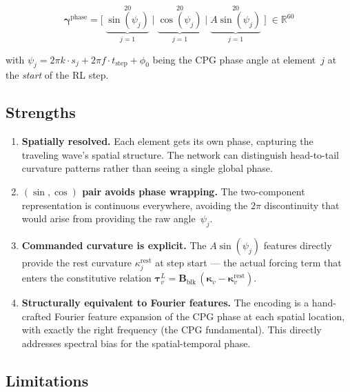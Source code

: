 \documentclass[11pt]{article}
\newcommand{\vect}[1]{\mathbf{#1}}
\newcommand{\mat}[1]{\mathbf{#1}}
\newcommand{\Real}{\mathbb{R}}
\begin{document}
\begin{equation}
  \vect{\gamma}^{\mathrm{phase}} =
  \bigl[\;
    \underbrace{\sin(\psi_j)}_{j=1}^{20}
    \;\big|\;
    \underbrace{\cos(\psi_j)}_{j=1}^{20}
    \;\big|\;
    \underbrace{A \sin(\psi_j)}_{j=1}^{20}
  \;\bigr]
  \;\in \Real^{60}
  \label{eq:phase-enc}
\end{equation}

\noindent
with $\psi_j = 2\pi k \cdot s_j + 2\pi f \cdot t_{\mathrm{step}} + \phi_0$
being the CPG phase angle at element~$j$ at the \emph{start} of the RL step.

\subsection{Strengths}

\begin{enumerate}[label=(\alph*)]
  \item \textbf{Spatially resolved.}
    Each element gets its own phase, capturing the traveling wave's spatial structure.
    The network can distinguish head-to-tail curvature patterns rather than seeing a
    single global phase.

  \item \textbf{$(\sin, \cos)$ pair avoids phase wrapping.}
    The two-component representation is continuous everywhere, avoiding the $2\pi$
    discontinuity that would arise from providing the raw angle~$\psi_j$.

  \item \textbf{Commanded curvature is explicit.}
    The $A \sin(\psi_j)$ features directly provide the rest curvature
    $\kappa_j^{\mathrm{rest}}$ at step start --- the actual forcing term that enters
    the constitutive relation
    $\bm{\tau}_v^L = \mat{B}_{\mathrm{blk}}\,(\bm{\kappa}_v - \bm{\kappa}_v^{\mathrm{rest}})$.

  \item \textbf{Structurally equivalent to Fourier features.}
    The encoding is a hand-crafted Fourier feature expansion of the CPG phase at
    each spatial location, with exactly the right frequency (the CPG fundamental).
    This directly addresses spectral bias for the spatial-temporal phase.
\end{enumerate}

\subsection{Limitations}
\label{sec:existing-limitations}
\end{document}
